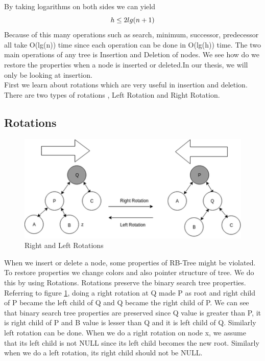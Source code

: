 \documentclass[BTech]{iitmdiss}
\begin{document}
By taking logarithms on both sides we can yield\\
\begin{equation}
        h \le 2lg(n+1)\\
\end{equation}
Because of this many operations such as search, minimum, successor, predecessor all take O(lg(n)) time since each operation can be done in O(lg(h)) time. The two main operations of any tree is Insertion and Deletion of nodes. We see how do we restore the properties when a node is inserted or deleted.In our thesis, we will only be looking at insertion.\\
First we learn about rotations which are very useful in insertion and deletion. There are two types of rotations , Left Rotation and Right Rotation.
\subsection{Rotations}
\begin{figure}[h]
    \centering
    \includegraphics{rsz_treap-rotation.png}
    \caption{Right and Left Rotations}
    \label{fig:rotation}
\end{figure}
When we insert or delete a node, some properties of RB-Tree might be violated. To restore properties we change colors and also pointer structure of tree. We do this by using Rotations. Rotations preserve the binary search tree properties.\\
Referring to figure \ref{fig:rotation}, doing a right rotation at Q  made P as root and right child of P became the left child of Q and Q became the right child of P. We can see that binary search tree properties are preserved since Q value is greater than P, it is right child of P and B value is lesser than Q and it is left child of Q. Similarly left rotation can be done. When we do a right rotation on node x, we assume that its left child is not NULL since its left child becomes the new root. Similarly when we do a left rotation, its right child should not be NULL.
\end{document}
